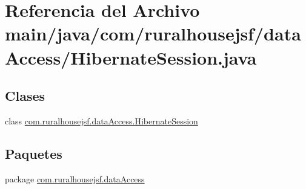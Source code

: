 \hypertarget{a00020}{}\section{Referencia del Archivo main/java/com/ruralhousejsf/data\+Access/\+Hibernate\+Session.java}
\label{a00020}
\subsection*{Clases}
\begin{DoxyCompactItemize}
\item 
class \mbox{\hyperlink{a00152}{com.\+ruralhousejsf.\+data\+Access.\+Hibernate\+Session}}
\end{DoxyCompactItemize}
\subsection*{Paquetes}
\begin{DoxyCompactItemize}
\item 
package \mbox{\hyperlink{a00112}{com.\+ruralhousejsf.\+data\+Access}}
\end{DoxyCompactItemize}
